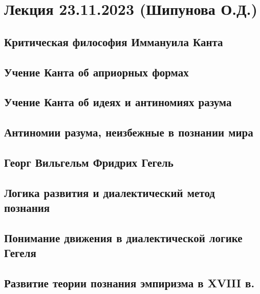 \documentclass[main.tex]{subfiles}
\begin{document}
\section{Лекция 23.11.2023 (Шипунова О.Д.)}


\subsection{Критическая философия Иммануила Канта}


\subsection{Учение Канта об априорных формах}


\subsection{Учение Канта об идеях и антиномиях разума}


\subsection{Антиномии разума, неизбежные в познании мира}


\subsection{Георг Вильгельм Фридрих Гегель}


\subsection{Логика развития и диалектический метод познания}


\subsection{Понимание движения в диалектической логике Гегеля}


\subsection{Развитие теории познания эмпиризма в XVIII в.}
\end{document}
